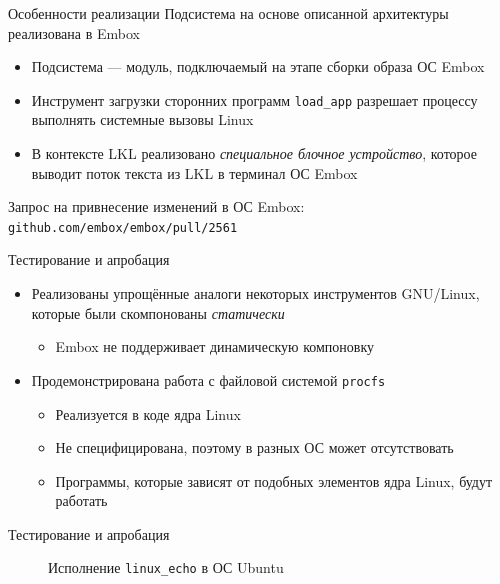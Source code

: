 \documentclass[english,russian,aspectratio=169]{beamer}
\begin{document}
\begin{frame}[t]{Особенности реализации}
Подсистема на основе описанной архитектуры реализована в Embox
\vspace{8pt}
\begin{itemize}
    \item Подсистема --- модуль, подключаемый на этапе сборки образа ОС Embox
    \item Инструмент загрузки сторонних программ \textcolor{MyGrey}{\texttt{load\_app}} разрешает процессу\newline
    выполнять системные вызовы Linux
    \item В контексте LKL реализовано \textit{специальное блочное устройство}, которое\newline
    выводит поток текста из LKL в терминал ОС Embox
\end{itemize}
\vspace{8pt}
Запрос на привнесение изменений в ОС Embox:\newline
\textcolor{MyGrey}{\texttt{github.com/embox/embox/pull/2561}}
\end{frame}

\begin{frame}[t]{Тестирование и апробация}
\vspace{8pt}
\begin{itemize}
    \item Реализованы упрощённые аналоги некоторых инструментов GNU/Linux,\newline
    которые были скомпонованы \textit{статически}
    \begin{itemize}
        \item Embox не поддерживает динамическую компоновку
    \end{itemize}
    \item Продемонстрирована работа с файловой системой \textcolor{MyGrey}{\texttt{procfs}}
    \begin{itemize}
        \item Реализуется в коде ядра Linux
        \item Не специфицирована, поэтому в разных ОС может отсутствовать
        \item Программы, которые зависят от подобных элементов ядра Linux, будут работать
    \end{itemize}
\end{itemize}
\end{frame}

\begin{frame}{Тестирование и апробация}
\begin{figure}[h]
\caption{{Исполнение \textcolor{MyGrey}{\texttt{linux\_echo} в ОС Ubuntu}}}
\end{figure}
\end{frame}
\end{document}
